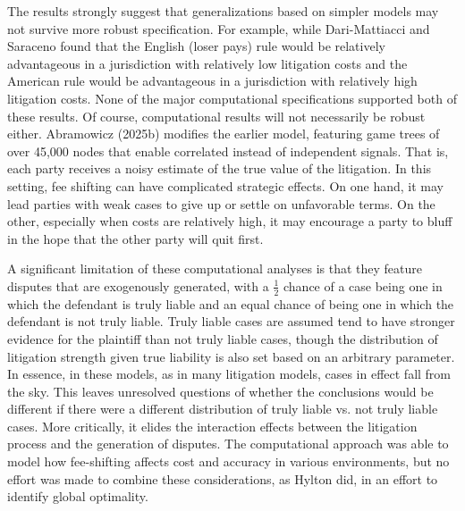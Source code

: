 \documentclass{article}
\begin{document}
The results strongly suggest that generalizations based on simpler models may not survive more robust specification. For example, while Dari-Mattiacci and Saraceno found that the English (loser pays) rule would be relatively advantageous in a jurisdiction with relatively low litigation costs and the American rule would be advantageous in a jurisdiction with relatively high litigation costs. None of the major computational specifications supported both of these results. Of course, computational results will not necessarily be robust either. Abramowicz (2025b) modifies the earlier model, featuring game trees of over 45,000 nodes that enable correlated instead of independent signals. That is, each party receives a noisy estimate of the true value of the litigation. In this setting, fee shifting can have complicated strategic effects. On one hand, it may lead parties with weak cases to give up or settle on unfavorable terms. On the other, especially when costs are relatively high, it may encourage a party to bluff in the hope that the other party will quit first. 

A significant limitation of these computational analyses is that they feature disputes that are exogenously generated, with a $\frac{1}{2}$ chance of a case being one in which the defendant is truly liable and an equal chance of being one in which the defendant is not truly liable. Truly liable cases are assumed tend to have stronger evidence for the plaintiff than not truly liable cases, though the distribution of litigation strength given true liability is also set based on an arbitrary parameter. In essence, in these models, as in many litigation models, cases in effect fall from the sky. This leaves unresolved questions of whether the conclusions would be different if there were a different distribution of truly liable vs. not truly liable cases. More critically, it elides the interaction effects between the litigation process and the generation of disputes. The computational approach was able to model how fee-shifting affects cost and accuracy in various environments, but no effort was made to combine these considerations, as Hylton did, in an effort to identify global optimality.
\end{document}
